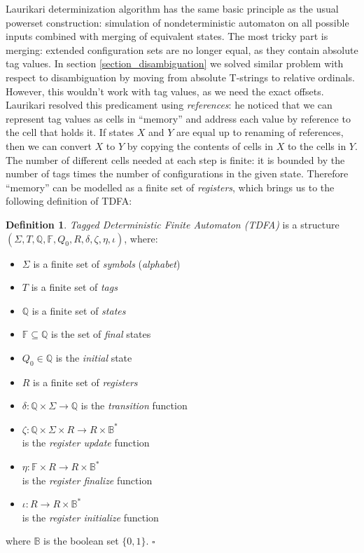 \documentclass{article}
\newcommand{\YB}{\mathbb{B}}
\newcommand{\YF}{\mathbb{F}}
\newcommand{\YQ}{\mathbb{Q}}
\theoremstyle{definition}
\newtheorem{Xdef}{Definition}
\begin{document}
\begin{multicols}{2}
Laurikari determinization algorithm has the same basic principle as the usual powerset construction:
simulation of nondeterministic automaton on all possible inputs combined with merging of equivalent states.
The most tricky part is merging: extended configuration sets are no longer equal, as they contain absolute tag values.
In section \ref{section_disambiguation} we solved similar problem with respect to disambiguation
by moving from absolute T-strings to relative ordinals.
However, this wouldn't work with tag values, as we need the exact offsets.
Laurikari resolved this predicament using \emph{references}:
he noticed that we can represent tag values as cells in ``memory'' and address each value by reference to the cell that holds it.
If states $X$ and $Y$ are equal up to renaming of references,
then we can convert $X$ to $Y$ by copying the contents of cells in $X$ to the cells in $Y$.
The number of different cells needed at each step is finite:
it is bounded by the number of tags times the number of configurations in the given state.
Therefore ``memory'' can be modelled as a finite set of \emph{registers},
which brings us to the following definition of TDFA:

    \begin{Xdef}
    \emph{Tagged Deterministic Finite Automaton (TDFA)}
    is a structure $(\Sigma, T, \YQ, \YF, Q_0, R, \delta, \zeta, \eta, \iota)$, where:
    \begin{itemize}
    \setlength{\parskip}{0.5em}
        \item[] $\Sigma$ is a finite set of \emph{symbols} (\emph{alphabet})
        \item[] $T$ is a finite set of \emph{tags}
        \item[] $\YQ$ is a finite set of \emph{states}
        \item[] $\YF \subseteq \YQ$ is the set of \emph{final} states
        \item[] $Q_0 \in \YQ$ is the \emph{initial} state
        \item[] $R$ is a finite set of \emph{registers}
        \item[] $\delta: \YQ \times \Sigma \to \YQ$ is the \emph{transition} function
        \item[] $\zeta: \YQ \times \Sigma \times R \to R \times \YB^*$ \\
            is the \emph{register update} function
        \item[] $\eta: \YF \times R \to R \times \YB^*$ \\
            is the \emph{register finalize} function
        \item[] $\iota: R \to R \times \YB^*$ \\
            is the \emph{register initialize} function
    \end{itemize}
    where $\YB$ is the boolean set $\{0,1\}$.
    $\square$
    \end{Xdef}


\end{multicols}
\end{document}
